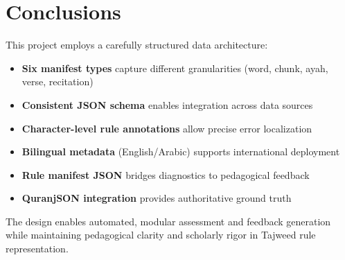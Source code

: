 \newpage


\section{Conclusions}

This project employs a carefully structured data architecture:

\begin{itemize}
    \item \textbf{Six manifest types} capture different granularities (word, chunk, ayah, verse, recitation)
    \item \textbf{Consistent JSON schema} enables integration across data sources
    \item \textbf{Character-level rule annotations} allow precise error localization
    \item \textbf{Bilingual metadata} (English/Arabic) supports international deployment
    \item \textbf{Rule manifest JSON} bridges diagnostics to pedagogical feedback
    \item \textbf{QuranjSON integration} provides authoritative ground truth
\end{itemize}

The design enables automated, modular assessment and feedback generation while maintaining pedagogical clarity and scholarly rigor in Tajweed rule representation.

